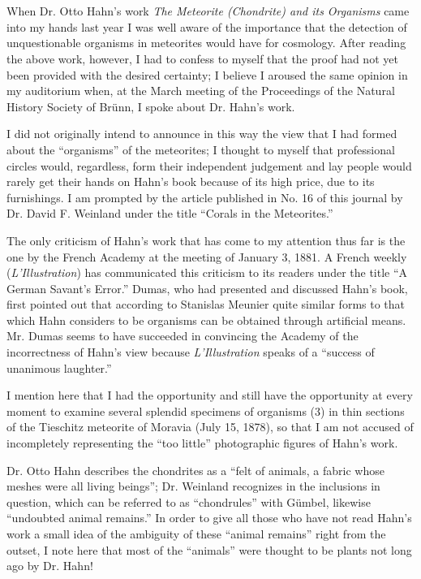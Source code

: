 \documentclass[a4paper, 12pt, oneside]{article}
\begin{document}
\section{}
\paragraph*{}
When Dr. Otto Hahn's work \emph{The Meteorite (Chondrite) and its Organisms} came into my hands last year I was well aware of the importance that the detection of unquestionable organisms in meteorites would have for cosmology. After reading the above work, however, I had to confess to myself that the proof had not yet been provided with the desired certainty; I believe I aroused the same opinion in my auditorium when, at the March meeting of the Proceedings of the Natural History Society of Brünn, I spoke about Dr. Hahn's work.

I did not originally intend to announce in this way the view that I had formed about the ``organisms'' of the meteorites; I thought to myself that professional circles would, regardless, form their independent judgement and lay people would rarely get their hands on Hahn's book because of its high price, due to its furnishings. I am prompted by the article published in No. 16 of this journal by Dr. David F. Weinland under the title ``Corals in the Meteorites.''

The only criticism of Hahn's work that has come to my attention thus far is the one by the French Academy at the meeting of January 3, 1881. A French weekly (\emph{L'Illustration}) has communicated this criticism to its readers under the title ``A German Savant's Error.'' Dumas, who had presented and discussed Hahn's book, first pointed out that according to Stanislas Meunier quite similar forms to that which Hahn considers to be organisms can be obtained through artificial means. Mr. Dumas seems to have succeeded in convincing the Academy of the incorrectness of Hahn's view because \emph{L'Illustration} speaks of a ``success of unanimous laughter.''

I mention here that I had the opportunity and still have the opportunity at every moment to examine several splendid specimens of organisms (3) in thin sections of the Tieschitz meteorite of Moravia (July 15, 1878), so that I am not accused of incompletely representing the ``too little'' photographic figures of Hahn's work.

Dr. Otto Hahn describes the chondrites as a ``felt of animals, a fabric whose meshes were all living beings''; Dr. Weinland recognizes in the inclusions in question, which can be referred to as ``chondrules'' with Gümbel, likewise ``undoubted animal remains.'' In order to give all those who have not read Hahn's work a small idea of the ambiguity of these ``animal remains'' right from the outset, I note here that most of the ``animals'' were thought to be plants not long ago by Dr. Hahn!
\end{document}
